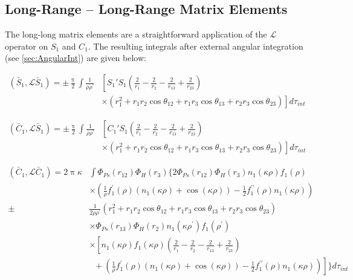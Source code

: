 \documentclass[Dissertation.tex]{subfiles}
\begin{document}
\subsection{Long-Range -- Long-Range Matrix Elements}
\label{sec:PWaveLongLong}

The long-long matrix elements are a straightforward application of the
$\mathcal{L}$ operator on $S_1$ and $C_1$. The resulting integrals after
external angular integration (see \cref{sec:AngularInt}) are given below: 

\begin{align}
\label{eq:PWaveSBarSBar}
\left(\bar{S}_1,\mathcal{L}\bar{S}_1\right) = \pm \frac{\uppi}{2} \int \frac{1}{\rho\rho^\prime} & \left[S_1' S_1 \left(\frac{2}{r_1} - \frac{2}{r_2} - \frac{2}{r_{13}} + \frac{2}{r_{23}} \right) \right.  \nonumber \\
& \left. \times \left(r_1^2 + r_1 r_2 \cos\theta_{12} + r_1 r_3 \cos\theta_{13} + r_2 r_3 \cos\theta_{23} \right) \right] d\tau_{int}
\end{align}

\begin{align}
\label{eq:PWaveCBarSBar}
\left(\bar{C}_1,\mathcal{L}\bar{S}_1\right) = \pm \frac{\uppi}{2} \int \frac{1}{\rho\rho^\prime} & \left[C_1' S_1 \left(\frac{2}{r_1} - \frac{2}{r_2} - \frac{2}{r_{13}} + \frac{2}{r_{23}} \right) \right.  \nonumber \\
& \left. \times \left(r_1^2 + r_1 r_2 \cos\theta_{12} + r_1 r_3 \cos\theta_{13} + r_2 r_3 \cos\theta_{23} \right) \right] d\tau_{int}
\end{align}

\begin{align}
\label{eq:PWaveCBarCBar}
\nonumber \left(\bar{C}_1,\mathcal{L}\bar{C}_1\right) = 2 \uppi \kappa & \int \Phi_{Ps}(r_{12}) \Phi_H(r_3) \Bigg\{ 2 \Phi_{Ps}(r_{12}) \Phi_H(r_3) n_1(\kappa\rho) f_1(\rho) \\
\nonumber & \times \left(\frac{1}{\rho} f_1^\prime(\rho) \left(n_1(\kappa\rho) + \cos(\kappa\rho)\right) - \frac{1}{2} f_1^{\prime\prime}(\rho) n_1(\kappa\rho)\right) \\
\nonumber \pm & \frac{1}{2\rho\rho^\prime} (r_1^2 + r_1 r_2 \cos\theta_{12} + r_1 r_3 \cos\theta_{13} + r_2 r_3 \cos\theta_{23}) \\
\nonumber & \times \Phi_{Ps}(r_{13}) \Phi_H(r_2) n_1(\kappa\rho^\prime) f_1(\rho^\prime) \\
\nonumber & \times \left[ n_1(\kappa\rho) f_1(\kappa\rho) \left(\frac{2}{r_1} - \frac{2}{r_2} - \frac{2}{r_{13}} + \frac{2}{r_{23}} \right) \right. \\
& \; \; + \left. \left(\frac{1}{\rho} f_1^\prime(\rho) \left(n_1(\kappa\rho) + \cos(\kappa\rho)\right) - \frac{1}{2} f_1^{\prime\prime}(\rho)  n_1(\kappa\rho)\right) \right]\Bigg\} d\tau_{int}
\end{align}
\end{document}
